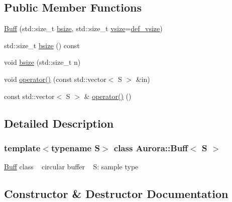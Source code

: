 \subsection*{Public Member Functions}
\begin{DoxyCompactItemize}
\item 
\hyperlink{class_aurora_1_1_buff_aaca7f3a2037c2c127969ca15ae1fca58}{Buff} (std\+::size\+\_\+t \hyperlink{class_aurora_1_1_buff_a8e1a05d615af725bce21de0fb10735a2}{bsize}, std\+::size\+\_\+t \hyperlink{class_aurora_1_1_snd_base_af9e21aaf411b17f7a8221c991ce5d291}{vsize}=\hyperlink{namespace_aurora_afaaddf667a06e7ce23c667a8b7295263}{def\+\_\+vsize})
\item 
std\+::size\+\_\+t \hyperlink{class_aurora_1_1_buff_a8e1a05d615af725bce21de0fb10735a2}{bsize} () const
\item 
void \hyperlink{class_aurora_1_1_buff_ac5b2377e34eb7ff03261e43e907ef0d2}{bsize} (std\+::size\+\_\+t n)
\item 
void \hyperlink{class_aurora_1_1_buff_a40884550c6105f427148f8663a54bc71}{operator()} (const std\+::vector$<$ S $>$ \&in)
\item 
const std\+::vector$<$ S $>$ \& \hyperlink{class_aurora_1_1_buff_ad1ccc1beacd029ca12f38005e3ae2daf}{operator()} ()
\end{DoxyCompactItemize}


\subsection{Detailed Description}
\subsubsection*{template$<$typename S$>$\newline
class Aurora\+::\+Buff$<$ S $>$}

\hyperlink{class_aurora_1_1_buff}{Buff} class ~\newline
circular buffer ~\newline
S\+: sample type 

\subsection{Constructor \& Destructor Documentation}
\mbox{\label{class_aurora_1_1_buff_aaca7f3a2037c2c127969ca15ae1fca58}} 
